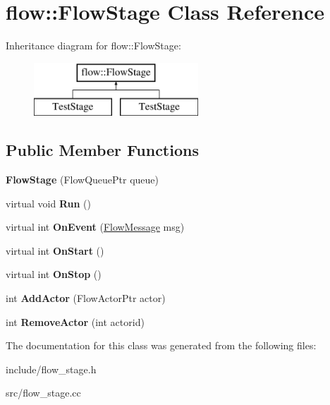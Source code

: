 \hypertarget{classflow_1_1_flow_stage}{}\section{flow\+:\+:Flow\+Stage Class Reference}
\label{classflow_1_1_flow_stage}
Inheritance diagram for flow\+:\+:Flow\+Stage\+:\begin{figure}[H]
\begin{center}
\leavevmode
\includegraphics[height=2.000000cm]{classflow_1_1_flow_stage}
\end{center}
\end{figure}
\subsection*{Public Member Functions}
\begin{DoxyCompactItemize}
\item 
{\bfseries Flow\+Stage} (Flow\+Queue\+Ptr queue)\hypertarget{classflow_1_1_flow_stage_a1bc09ff1747597633b08506efc1da392}{}\label{classflow_1_1_flow_stage_a1bc09ff1747597633b08506efc1da392}

\item 
virtual void {\bfseries Run} ()\hypertarget{classflow_1_1_flow_stage_acb0a09671c506e01914c57b2d43eacde}{}\label{classflow_1_1_flow_stage_acb0a09671c506e01914c57b2d43eacde}

\item 
virtual int {\bfseries On\+Event} (\hyperlink{classflow_1_1_flow_message}{Flow\+Message} msg)\hypertarget{classflow_1_1_flow_stage_a5a7cde04abb3e867123958535ec4dfb5}{}\label{classflow_1_1_flow_stage_a5a7cde04abb3e867123958535ec4dfb5}

\item 
virtual int {\bfseries On\+Start} ()\hypertarget{classflow_1_1_flow_stage_a1832791b22ef26b36ac2d62896f81ab1}{}\label{classflow_1_1_flow_stage_a1832791b22ef26b36ac2d62896f81ab1}

\item 
virtual int {\bfseries On\+Stop} ()\hypertarget{classflow_1_1_flow_stage_a401b90919242a309d44baa610e0d82b9}{}\label{classflow_1_1_flow_stage_a401b90919242a309d44baa610e0d82b9}

\item 
int {\bfseries Add\+Actor} (Flow\+Actor\+Ptr actor)\hypertarget{classflow_1_1_flow_stage_acb790a4491168c008d43ab090b9b4a60}{}\label{classflow_1_1_flow_stage_acb790a4491168c008d43ab090b9b4a60}

\item 
int {\bfseries Remove\+Actor} (int actorid)\hypertarget{classflow_1_1_flow_stage_aefc3b5e26eb0882e991f5804aa79b70e}{}\label{classflow_1_1_flow_stage_aefc3b5e26eb0882e991f5804aa79b70e}

\end{DoxyCompactItemize}


The documentation for this class was generated from the following files\+:\begin{DoxyCompactItemize}
\item 
include/flow\+\_\+stage.\+h\item 
src/flow\+\_\+stage.\+cc\end{DoxyCompactItemize}
